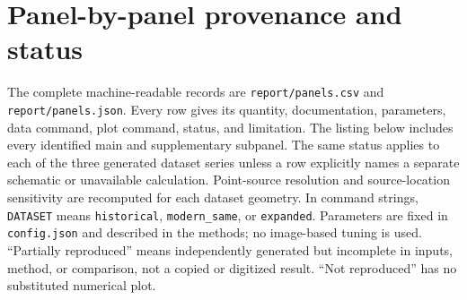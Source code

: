 \documentclass[10pt]{article}
\begin{document}
\clearpage\section{Panel-by-panel provenance and status}
The complete machine-readable records are \texttt{report/panels.csv} and
\texttt{report/panels.json}. Every row gives its quantity, documentation,
parameters, data command, plot command, status, and limitation. The listing below
includes every identified main and supplementary subpanel. The same status applies
to each of the three generated dataset series unless a row explicitly names
a separate schematic or unavailable calculation. Point-source resolution and
source-location sensitivity are recomputed for each dataset geometry. In command strings,
\texttt{DATASET} means \texttt{historical}, \texttt{modern\_same}, or
\texttt{expanded}. Parameters are fixed in \texttt{config.json} and described
in the methods; no image-based tuning is used. ``Partially reproduced'' means
independently generated but incomplete in inputs, method, or comparison, not a
copied or digitized result. ``Not reproduced'' has no substituted numerical plot.
\end{document}

